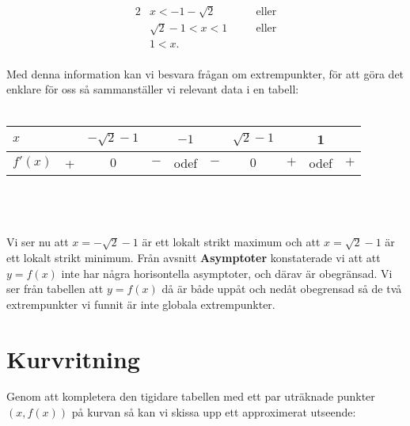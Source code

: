 \documentclass{article}
\begin{document}
\begin{alignat*}{2}
  & x < -1 - \sqrt{2} &&\quad\text{eller}\\
  & \sqrt{2} - 1 < x < 1 &&\quad\text{eller} \\
  & 1 < x\text{.} &&
\end{alignat*}
\\
Med denna information kan vi besvara frågan om extrempunkter, för att göra det enklare för oss så sammanställer vi relevant data i en tabell:
\\
\\
\begin{tabular}[c]{l | c | c | c | c | c | c | c | c | c}
  $x$     &   & $-\sqrt{2} - 1$ &     & $-1$ &     & $\sqrt{2} - 1$ &     & 1    &     \\ \hline
  $f'(x)$ & + & $0$             & $-$ & odef & $-$ & $0$            & $+$ & odef & $+$ \\
\end{tabular}
\\
\\
\\
Vi ser nu att $x = -\sqrt{2} - 1$ är ett lokalt strikt maximum och att $x = \sqrt{2} - 1$ är ett lokalt strikt minimum. Från avsnitt \textbf{Asymptoter} konstaterade vi att att $y = f(x)$ inte har några horisontella asymptoter, och därav är obegränsad. Vi ser från tabellen att $y = f(x)$ då är både uppåt och nedåt obegrensad så de två extrempunkter vi funnit är inte globala extrempunkter.

\section*{Kurvritning}

Genom att kompletera den tigidare tabellen med ett par uträknade punkter $(x, f(x))$ på kurvan så kan vi skissa upp ett approximerat utseende:
\end{document}
